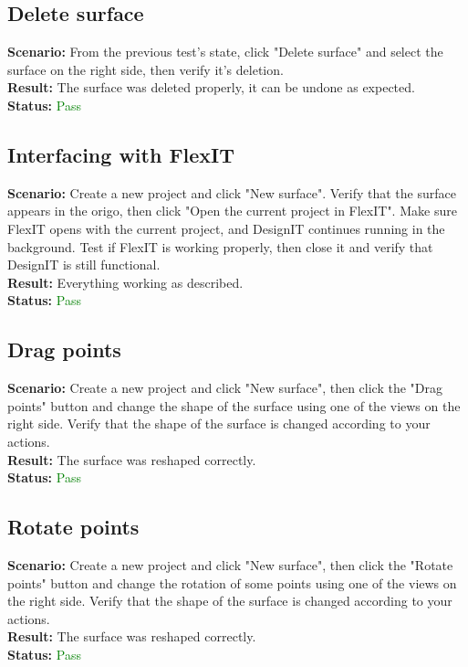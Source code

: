 \documentclass[a4paper, 11pt, article]{report}
\begin{document}
\subsection{Delete surface}

\noindent \textbf{Scenario:} From the previous test's state, click "Delete surface" and select the surface on the right side, then verify it's deletion.
\\
\noindent \textbf{Result:} The surface was deleted properly, it can be undone as expected.
\\
\noindent \textbf{Status:} \textcolor{green}{Pass}

\subsection{Interfacing with FlexIT}

\noindent \textbf{Scenario:} Create a new project and click "New surface". Verify that the surface appears in the origo, then click "Open the current project in FlexIT". Make sure FlexIT opens with the current project, and DesignIT continues running in the background. Test if FlexIT is working properly, then close it and verify that DesignIT is still functional.
\\
\noindent \textbf{Result:} Everything working as described.
\\
\noindent \textbf{Status:} \textcolor{green}{Pass}

\subsection{Drag points}

\noindent \textbf{Scenario:} Create a new project and click "New surface", then click the "Drag points" button and change the shape of the surface using one of the views on the right side. Verify that the shape of the surface is changed according to your actions.
\\
\noindent \textbf{Result:} The surface was reshaped correctly.
\\
\noindent \textbf{Status:} \textcolor{green}{Pass}

\subsection{Rotate points}

\noindent \textbf{Scenario:} Create a new project and click "New surface", then click the "Rotate points" button and change the rotation of some points using one of the views on the right side. Verify that the shape of the surface is changed according to your actions.
\\
\noindent \textbf{Result:} The surface was reshaped correctly.
\\
\noindent \textbf{Status:} \textcolor{green}{Pass}
\end{document}
